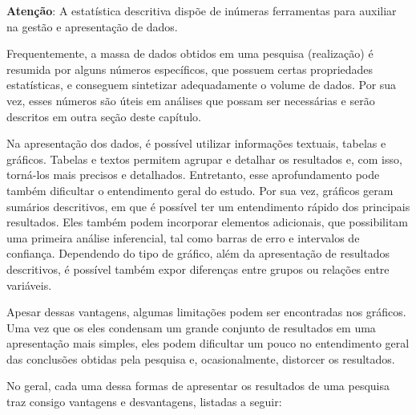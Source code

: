 \documentclass[
]{book}
\newenvironment{warning}{
  \definecolor{shadecolor}{rgb}{0, 0, 0}  %
  \color{white}
  \begin{shaded}}
 {\end{shaded}}
\begin{document}
\begin{warning}

\textbf{Atenção}: A estatística descritiva dispõe de inúmeras ferramentas para auxiliar na gestão e apresentação de dados.

\end{warning}

Frequentemente, a massa de dados obtidos em uma pesquisa (realização) é resumida por alguns números específicos, que possuem certas propriedades estatísticas, e conseguem sintetizar adequadamente o volume de dados. Por sua vez, esses números são úteis em análises que possam ser necessárias e serão descritos em outra seção deste capítulo.

Na apresentação dos dados, é possível utilizar informações textuais, tabelas e gráficos. Tabelas e textos permitem agrupar e detalhar os resultados e, com isso, torná-los mais precisos e detalhados. Entretanto, esse aprofundamento pode também dificultar o entendimento geral do estudo. Por sua vez, gráficos geram sumários descritivos, em que é possível ter um entendimento rápido dos principais resultados. Eles também podem incorporar elementos adicionais, que possibilitam uma primeira análise inferencial, tal como barras de erro e intervalos de confiança. Dependendo do tipo de gráfico, além da apresentação de resultados descritivos, é possível também expor diferenças entre grupos ou relações entre variáveis.

Apesar dessas vantagens, algumas limitações podem ser encontradas nos gráficos. Uma vez que os eles condensam um grande conjunto de resultados em uma apresentação mais simples, eles podem dificultar um pouco no entendimento geral das conclusões obtidas pela pesquisa e, ocasionalmente, distorcer os resultados.

No geral, cada uma dessa formas de apresentar os resultados de uma pesquisa traz consigo vantagens e desvantagens, listadas a seguir:
\end{document}
